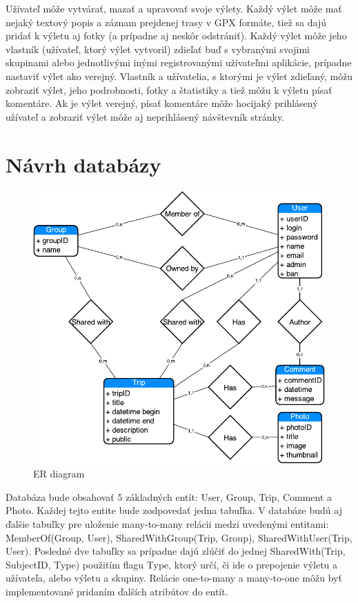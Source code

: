 \documentclass[12pt,a4paper]{scrartcl}
\begin{document}
Užívateľ môže vytvárať, mazať a upravovať svoje výlety. Každý výlet môže mať nejaký textový popis a záznam prejdenej trasy v GPX formáte, tiež sa dajú pridať k výletu aj fotky (a prípadne aj neskôr odstrániť). Každý výlet môže jeho vlastník (užívateľ, ktorý výlet vytvoril) zdieľať buď s vybranými svojimi skupinami alebo jednotlivými inými registrovanými užívateľmi aplikácie, prípadne nastaviť výlet ako verejný. Vlastník a užívatelia, s ktorými je výlet zdieľaný, môžu zobraziť výlet, jeho podrobnosti, fotky a štatistiky a tiež môžu k výletu písať komentáre. Ak je výlet verejný, písať komentáre môže hocijaký prihlásený užívateľ a zobraziť výlet môže aj neprihlásený návštevník stránky.

\section{Návrh databázy}

\begin{figure}[H]
	\centering
	\includegraphics{use_case/turistika_er_diagram.pdf}
	\caption{ER diagram}
\end{figure}

Databáza bude obsahovať 5 základných entít: User, Group, Trip, Comment a Photo. Každej tejto entite bude zodpovedať jedna tabuľka. V databáze budú aj ďalšie tabuľky pre uloženie many-to-many relácii medzi uvedenými entitami: MemberOf(Group, User), SharedWithGroup(Trip, Group), SharedWithUser(Trip, User). Posledné dve tabuľky sa prípadne dajú zlúčiť do jednej SharedWith(Trip, SubjectID, Type) použitím flagu Type, ktorý určí, či ide o prepojenie výletu a užívateľa, alebo výletu a skupiny. Relácie one-to-many a many-to-one môžu byť implementované pridaním ďalších atribútov do entít.
\end{document}
